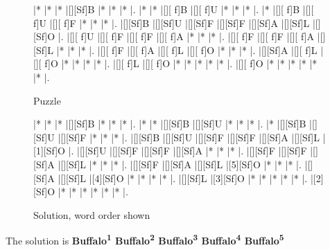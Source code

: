 \documentclass[letterpaper]{article}
\begin{document}
\vspace*{1em}
\begin{figure}[H]
\begin{minipage}{0.48\textwidth}
    \centering
    \begin{Puzzle}{7}{11}
        |*        |*        |*        |[][Sf]B  |*        |*        |*        |.
        |*        |*        |[][ f]B  |[][ f]U  |*        |*        |*        |.
        |*        |[][ f]B  |[][ f]U  |[][ f]F  |*        |*        |*        |.
        |[][Sf]B  |[][Sf]U  |[][Sf]F  |[][Sf]F  |[][Sf]A  |[][Sf]L  |[][Sf]O  |.
        |[][ f]U  |[][ f]F  |[][ f]F  |[][ f]A  |*        |*        |*        |.
        |[][ f]F  |[][ f]F  |[][ f]A  |[][Sf]L  |*        |*        |*        |.
        |[][ f]F  |[][ f]A  |[][ f]L  |[][ f]O  |*        |*        |*        |.
        |[][Sf]A  |[][ f]L  |[][ f]O  |*        |*        |*        |*        |.
        |[][ f]L  |[][ f]O  |*        |*        |*        |*        |*        |.
        |[][ f]O  |*        |*        |*        |*        |*        |*        |.
        \end{Puzzle}
    \caption*{Puzzle}
\end{minipage}
\hfill
\begin{minipage}{0.48\textwidth}
    \centering
    \begin{Puzzle}{7}{11}
        |*        |*        |*        |[][Sf]B  |*        |*        |*        |.
        |*        |*        |[][Sf]B  |[][Sf]U  |*        |*        |*        |.
        |*        |[][Sf]B  |[][Sf]U  |[][Sf]F  |*        |*        |*        |.
        |[][Sf]B  |[][Sf]U  |[][Sf]F  |[][Sf]F  |[][Sf]A  |[][Sf]L  |[1][Sf]O |.
        |[][Sf]U  |[][Sf]F  |[][Sf]F  |[][Sf]A  |*        |*        |*        |.
        |[][Sf]F  |[][Sf]F  |[][Sf]A  |[][Sf]L  |*        |*        |*        |.
        |[][Sf]F  |[][Sf]A  |[][Sf]L  |[5][Sf]O |*        |*        |*        |.
        |[][Sf]A  |[][Sf]L  |[4][Sf]O |*        |*        |*        |*        |.
        |[][Sf]L  |[3][Sf]O |*        |*        |*        |*        |*        |.
        |[2][Sf]O |*        |*        |*        |*        |*        |*        |.
        \end{Puzzle}
    \caption*{Solution, word order shown}
\end{minipage}
\end{figure}

The solution is \textbf{Buffalo\textsuperscript{1} Buffalo\textsuperscript{2} Buffalo\textsuperscript{3} Buffalo\textsuperscript{4} Buffalo\textsuperscript{5}}
\end{document}
